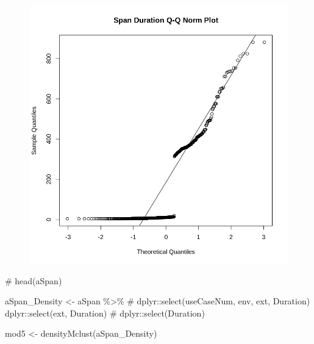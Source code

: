 \documentclass[
  letterpaper,
  DIV=11,
  numbers=noendperiod]{scrartcl}
\newenvironment{Shaded}{\begin{snugshade}}{\end{snugshade}}
\newcommand{\CommentTok}[1]{\textcolor[rgb]{0.37,0.37,0.37}{#1}}
\newcommand{\FunctionTok}[1]{\textcolor[rgb]{0.28,0.35,0.67}{#1}}
\newcommand{\NormalTok}[1]{\textcolor[rgb]{0.00,0.23,0.31}{#1}}
\newcommand{\OtherTok}[1]{\textcolor[rgb]{0.00,0.23,0.31}{#1}}
\newcommand{\SpecialCharTok}[1]{\textcolor[rgb]{0.37,0.37,0.37}{#1}}
\begin{document}
\begin{figure}[H]

{\centering \includegraphics{dss-span-analysis-rev5_files/figure-pdf/cell-48-output-1.png}

}

\end{figure}

\begin{Shaded}
\begin{Highlighting}[]
\CommentTok{\# head(aSpan)}
\end{Highlighting}
\end{Shaded}

\begin{Shaded}
\begin{Highlighting}[]
\NormalTok{aSpan\_Density }\OtherTok{\textless{}{-}}\NormalTok{ aSpan }\SpecialCharTok{\%\textgreater{}\%}
    \CommentTok{\# dplyr::select(useCaseNum, env, ext, Duration)}
\NormalTok{    dplyr}\SpecialCharTok{::}\FunctionTok{select}\NormalTok{(ext, Duration)}
    \CommentTok{\# dplyr::select(Duration)}
\end{Highlighting}
\end{Shaded}

\begin{Shaded}
\begin{Highlighting}[]
\NormalTok{mod5 }\OtherTok{\textless{}{-}} \FunctionTok{densityMclust}\NormalTok{(aSpan\_Density)}
\end{Highlighting}
\end{Shaded}
\end{document}
